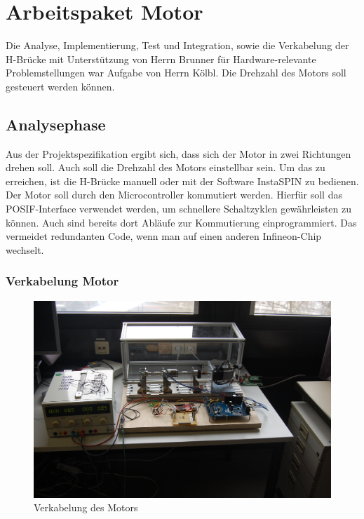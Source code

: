 

\chapter{Arbeitspaket Motor}
Die Analyse, Implementierung, Test und Integration, sowie die Verkabelung der H-Brücke mit Unterst\"utzung von Herrn Brunner f\"ur Hardware-relevante Problemstellungen war Aufgabe von Herrn Kölbl. Die Drehzahl des Motors soll gesteuert werden können.

\section{Analysephase}
Aus der Projektspezifikation ergibt sich, dass sich der Motor in zwei Richtungen drehen soll. Auch soll die Drehzahl des Motors einstellbar sein. Um das zu erreichen, ist die H-Brücke manuell oder mit der Software InstaSPIN zu bedienen. Der Motor soll durch den Microcontroller kommutiert werden. Hierfür soll das POSIF-Interface verwendet werden, um schnellere Schaltzyklen gewährleisten zu können. Auch sind bereits dort Abläufe zur Kommutierung einprogrammiert. Das vermeidet redundanten Code, wenn man auf einen anderen Infineon-Chip wechselt.

\subsection{Verkabelung Motor}
\begin{figure}
    \includegraphics[width=\textwidth]{motor/MotorWiring.JPG}
    \caption{Verkabelung des Motors}
    \label{fig:MotorWiring}
\end{figure}

